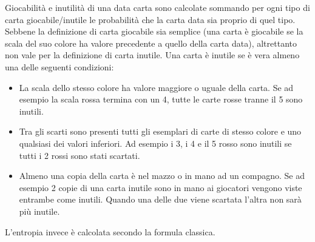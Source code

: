 \documentclass{article}
\begin{document}
\begin{flushleft}
Giocabilità e inutilità di una data carta sono calcolate sommando per ogni tipo di carta giocabile/inutile le probabilità che la carta data sia proprio di quel tipo. \newline
Sebbene la definizione di carta giocabile sia semplice (una carta è giocabile se la scala del suo colore ha valore precedente a quello della carta data), altrettanto non vale per la definizione di carta inutile. Una carta è inutile se è vera almeno una delle seguenti condizioni:
\begin{itemize}
    \item La scala dello stesso colore ha valore maggiore o uguale della carta.\newline
    Se ad esempio la scala rossa termina con un 4, tutte le carte rosse tranne il 5 sono inutili.
    \item Tra gli scarti sono presenti tutti gli esemplari di carte di stesso colore e uno qualsiasi dei valori inferiori.\newline
    Ad esempio i 3, i 4 e il 5 rosso sono inutili se tutti i 2 rossi sono stati scartati.
    \item Almeno una copia della carta è nel mazzo o in mano ad un compagno.\newline
    Se ad esempio 2 copie di una carta inutile sono in mano ai giocatori vengono viste entrambe come inutili. Quando una delle due viene scartata l'altra non sarà più inutile.
\end{itemize}
\end{flushleft}
L'entropia invece è calcolata secondo la formula classica.
\end{document}
